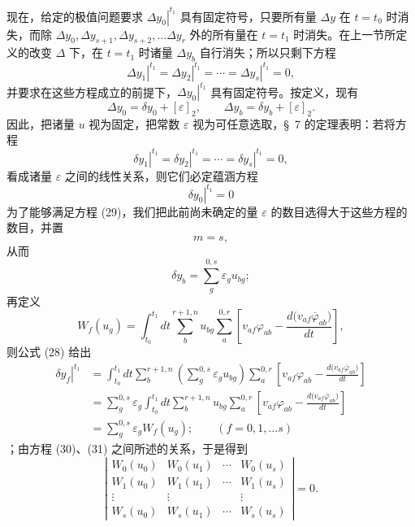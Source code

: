\documentclass[11pt,a4paper,leqno]{article}
\begin{document}
现在，给定的极值问题要求 $\left.\Delta y_0\right|^{t_1}$ 具有固定符号，只要所有量 $\Delta y$ 在 $t=t_0$ 时消失，而除 $\Delta y_0,\Delta y_{s+1},\Delta y_{s+2},\ldots\Delta y_r$ 外的所有量在 $t=t_1$ 时消失。在上一节所定义的改变 $\Delta$ 下，在 $t=t_1$ 时诸量 $\Delta y_b$ 自行消失；所以只剩下方程
\begin{equation}\tag{29}
\left.\Delta y_1\right|^{t_1}
=\left.\Delta y_2\right|^{t_1}
=\cdots
=\left.\Delta y_s\right|^{t_1}=0,
\end{equation}
并要求在这些方程成立的前提下，$\left.\Delta y_0\right|^{t_1}$ 具有固定符号。按定义，现有
\[
\Delta y_0=\delta y_0+[\varepsilon]_2,
\qquad
\Delta y_b=\delta y_b+[\varepsilon]_2.
\]
因此，把诸量 $u$ 视为固定，把常数 $\varepsilon$ 视为可任意选取，\S~7 的定理表明：若将方程
\begin{equation}\tag{30}
\left.\delta y_1\right|^{t_1}
=\left.\delta y_2\right|^{t_1}
=\cdots
=\left.\delta y_s\right|^{t_1}=0,
\end{equation}
看成诸量 $\varepsilon$ 之间的线性关系，则它们必定蕴涵方程
\begin{equation}\tag{31}
\left.\delta y_0\right|^{t_1}=0
\end{equation}
为了能够满足方程 (29)，我们把此前尚未确定的量 $\varepsilon$ 的数目选得大于这些方程的数目，并置
\[
m=s,
\]
从而
\[
\delta y_b=\sum_g^{0,s}\varepsilon_g u_{bg};
\]
再定义
\[
W_f(u_g)=
\int_{t_0}^{t_1}dt\sum_b^{r+1,n}u_{bg}\sum_a^{0,r}
\left[
v_{af}\varphi_{ab}-\frac{d\bigl(v_{af}\overline{\varphi}_{ab}\bigr)}{dt}
\right],
\]
则公式 (28) 给出
\begin{align*}
\left.\delta y_f\right|^{t_1}
&=
\int_{t_0}^{t_1}dt\sum_b^{r+1,n}
\left(\sum_g^{0,s}\varepsilon_gu_{bg}\right)
\sum_a^{0,r}
\left[
v_{af}\varphi_{ab}-\frac{d\bigl(v_{af}\overline{\varphi}_{ab}\bigr)}{dt}
\right]\\
&=
\sum_g^{0,s}\varepsilon_g
\int_{t_0}^{t_1}dt\sum_b^{r+1,n}u_{bg}\sum_a^{0,r}
\left[
v_{af}\varphi_{ab}-\frac{d\bigl(v_{af}\overline{\varphi}_{ab}\bigr)}{dt}
\right]\\
&=
\sum_g^{0,s}\varepsilon_gW_f(u_g);
\qquad(f=0,1,\ldots s)
\end{align*}
；由方程 (30)、(31) 之间所述的关系，于是得到
\[
\left|
\begin{matrix}
W_0(u_0)&W_0(u_1)&\cdots&W_0(u_s)\\
W_1(u_0)&W_1(u_1)&\cdots&W_1(u_s)\\
\vdots&\vdots&&\vdots\\
W_s(u_0)&W_s(u_1)&\cdots&W_s(u_s)
\end{matrix}
\right|=0.
\]
\end{document}

